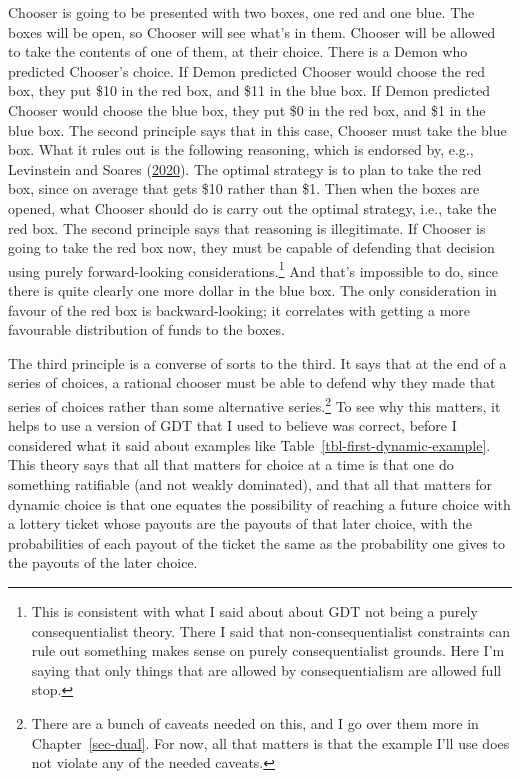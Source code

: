 \documentclass[
  12pt,
  letterpaper,
  DIV=11,
  numbers=noendperiod]{scrreprt}
\begin{document}
Chooser is going to be presented with two boxes, one red and one blue.
The boxes will be open, so Chooser will see what's in them. Chooser will
be allowed to take the contents of one of them, at their choice. There
is a Demon who predicted Chooser's choice. If Demon predicted Chooser
would choose the red box, they put \$10 in the red box, and \$11 in the
blue box. If Demon predicted Chooser would choose the blue box, they put
\$0 in the red box, and \$1 in the blue box. The second principle says
that in this case, Chooser must take the blue box. What it rules out is
the following reasoning, which is endorsed by, e.g., Levinstein and
Soares (\protect\hyperlink{ref-LevinsteinSoares2020}{2020}). The optimal
strategy is to plan to take the red box, since on average that gets \$10
rather than \$1. Then when the boxes are opened, what Chooser should do
is carry out the optimal strategy, i.e., take the red box. The second
principle says that reasoning is illegitimate. If Chooser is going to
take the red box now, they must be capable of defending that decision
using purely forward-looking considerations.\footnote{This is consistent
  with what I said about about GDT not being a purely consequentialist
  theory. There I said that non-consequentialist constraints can rule
  out something makes sense on purely consequentialist grounds. Here I'm
  saying that only things that are allowed by consequentialism are
  allowed full stop.} And that's impossible to do, since there is quite
clearly one more dollar in the blue box. The only consideration in
favour of the red box is backward-looking; it correlates with getting a
more favourable distribution of funds to the boxes.

The third principle is a converse of sorts to the third. It says that at
the end of a series of choices, a rational chooser must be able to
defend why they made that series of choices rather than some alternative
series.\footnote{There are a bunch of caveats needed on this, and I go
  over them more in Chapter~\ref{sec-dual}. For now, all that matters is
  that the example I'll use does not violate any of the needed caveats.}
To see why this matters, it helps to use a version of GDT that I used to
believe was correct, before I considered what it said about examples
like Table~\ref{tbl-first-dynamic-example}. This theory says that all
that matters for choice at a time is that one do something ratifiable
(and not weakly dominated), and that all that matters for dynamic choice
is that one equates the possibility of reaching a future choice with a
lottery ticket whose payouts are the payouts of that later choice, with
the probabilities of each payout of the ticket the same as the
probability one gives to the payouts of the later choice.
\end{document}
